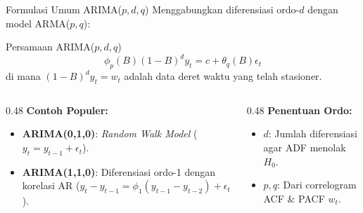 \documentclass[aspectratio=169, 10pt]{beamer}
\begin{document}
\begin{frame}{Formulasi Umum ARIMA($p,d,q$)}
    Menggabungkan diferensiasi ordo-$d$ dengan model ARMA($p,q$):
    \begin{block}{Persamaan ARIMA($p,d,q$)}
        \begin{equation}
            \phi_p(B)(1 - B)^d y_t = c + \theta_q(B)\epsilon_t
        \end{equation}
        di mana $(1-B)^d y_t = w_t$ adalah data deret waktu yang telah stasioner.
    \end{block}
    \begin{columns}[T]
        \begin{column}{0.48\textwidth}
            \textbf{Contoh Populer:}
            \begin{itemize}
                \item \textbf{ARIMA(0,1,0)}: \textit{Random Walk Model} ($y_t = y_{t-1} + \epsilon_t$).
                \item \textbf{ARIMA(1,1,0)}: Diferensiasi ordo-1 dengan korelasi AR ($y_t - y_{t-1} = \phi_1(y_{t-1} - y_{t-2}) + \epsilon_t$).
            \end{itemize}
        \end{column}
        \begin{column}{0.48\textwidth}
            \textbf{Penentuan Ordo:}
            \begin{itemize}
                \item $d$: Jumlah diferensiasi agar ADF menolak $H_0$.
                \item $p, q$: Dari correlogram ACF \& PACF $w_t$.
            \end{itemize}
        \end{column}
    \end{columns}
\end{frame}
\end{document}
